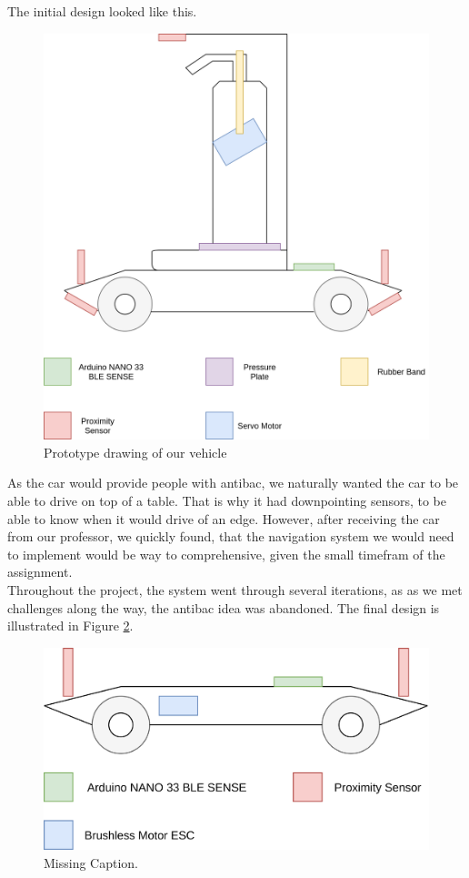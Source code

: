 \documentclass{article}
\begin{document}
The initial design looked like this. 

\begin{figure}[H]
	\centering
	\includegraphics[width=\linewidth]{prototype-drawing.png}
	\caption{Prototype drawing of our vehicle}
	\label{ProtoDrawing}
\end{figure}

As the car would provide people with antibac, we naturally wanted the car to be able to drive on top of a table. That is why it had downpointing sensors, to be able to know when it would drive of an edge. However, after receiving the car from our professor, we quickly found, that the navigation system we would need to implement would be way to comprehensive, given the small timefram of the assignment.\\ 

Throughout the project, the system went through several iterations, as as we met challenges along the way, the antibac idea was abandoned. The final design is illustrated in Figure \ref{final-design}. 

\begin{figure}[H]
	\centering
	\includegraphics[width=\linewidth]{final-design.png}
    \caption{Missing Caption.}
	\label{final-design}
\end{figure}
\end{document}
